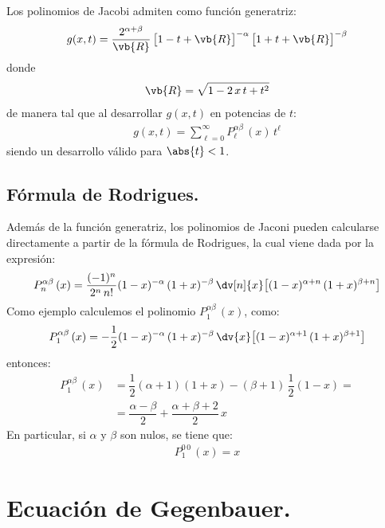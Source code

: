 Los polinomios de Jacobi admiten como función generatriz:
\begin{align*}
g(x, t) = \dfrac{2^{\alpha+\beta}}{\vb{R}} \, \big[ 1 - t + \vb{R} \big]^{-\alpha} \, \big[ 1 + t + \vb{R} \big]^{-\beta}
\end{align*}
donde
\begin{align*}
\vb{R} = \sqrt{1 - 2 \, x \, t + t^{2}}
\end{align*}
de manera tal que al desarrollar $g(x, t)$ en potencias de $t$:
\begin{align*}
g(x, t) = \sum_{\ell=0}^{\infty} P_{\ell}^{\alpha \beta} \, (x) \, t^{\ell}
\end{align*}
siendo un desarrollo válido para $\abs{t} < 1$.

\subsection{Fórmula de Rodrigues.}

Además de la función generatriz, los polinomios de Jaconi pueden calcularse directamente a partir de la fórmula de Rodrigues, la cual viene dada por la expresión:
\begin{align*}
P_{n}^{\alpha \beta} \, (x) = \dfrac{(-1)^{n}}{2^{n} \, n!} (1 - x)^{-\alpha} \, (1 + x)^{-\beta} \, \dv[n]{x} \big[ (1 - x)^{\alpha+n} \, (1 + x)^{\beta+n} \big]
\end{align*}
Como ejemplo calculemos el polinomio $P_{1}^{\alpha \beta} \, (x)$, como:
\begin{align*}
P_{1}^{\alpha \beta} \, (x) = - \dfrac{1}{2} (1 - x)^{- \alpha} \, (1 + x)^{-\beta} \, \dv{x} \big[ (1 - x)^{\alpha+1} \, (1 + x)^{\beta+1} \big]
\end{align*}
entonces:
\begin{align*}
P_{1}^{\alpha \beta} \, (x) &= \dfrac{1}{2} (\alpha + 1)(1 + x) - (\beta + 1) \, \dfrac{1}{2} (1 - x) = \\[0.5em]
&= \dfrac{\alpha - \beta}{2} + \dfrac{\alpha + \beta + 2}{2} \, x
\end{align*}
En particular, si $\alpha$ y $\beta$ son nulos, se tiene que:
\begin{align*}
P_{1}^{0 \, 0} \, (x) =  x
\end{align*}

\section{Ecuación de Gegenbauer.}

